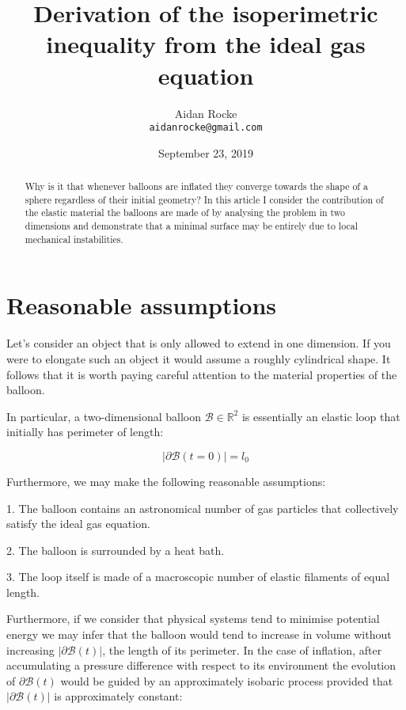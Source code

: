 \documentclass{article}
\title{Derivation of the isoperimetric inequality from the ideal gas equation}
\date{September 23, 2019}
\author{%
  Aidan Rocke\\
  \texttt{aidanrocke@gmail.com} \\
}
\begin{document}
\maketitle

\begin{abstract}
   Why is it that whenever balloons are inflated they converge towards the shape of a sphere regardless of their initial geometry? In this article I consider the contribution of the elastic material the balloons are made of by analysing the problem in two dimensions and demonstrate that a minimal
surface may be entirely due to local mechanical instabilities.
\end{abstract}

\section{Reasonable assumptions}

Let's consider an object that is only allowed to extend in one dimension. If you were to elongate such an object it would assume a roughly cylindrical shape. It follows that it is worth paying careful attention to the material properties of the balloon.

In particular, a two-dimensional balloon $\mathcal{B} \in \mathbb{R}^2$ is essentially an elastic loop that initially has perimeter of length:

\begin{equation}
\lvert \partial \mathcal{B}(t=0) \rvert = l_0
\end{equation}

Furthermore, we may make the following reasonable assumptions:

1. The balloon contains an astronomical number of gas particles that collectively satisfy the ideal gas equation.

2. The balloon is surrounded by a heat bath.

3. The loop itself is made of a macroscopic number of elastic filaments of equal length.

Furthermore, if we consider that physical systems tend to minimise potential energy we may infer that the balloon would tend to increase in volume
without increasing $\lvert \partial \mathcal{B}(t) \rvert$, the length of its perimeter. In the case of inflation, after accumulating a pressure difference with respect to its environment the evolution of $\partial \mathcal{B}(t)$
would be guided by an approximately isobaric process provided that $\lvert \partial \mathcal{B}(t) \rvert$ is approximately constant:
\end{document}
